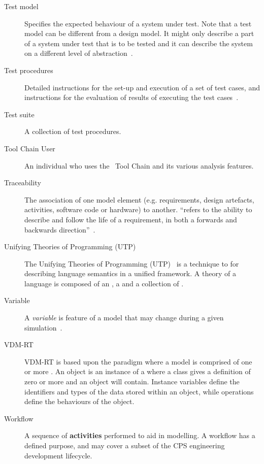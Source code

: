 \begin{description}
\item[Test model] Specifies the expected behaviour of a system under test. Note that a test model can be different from a design model. It might only describe a part of a system under test that is to be tested and it can describe the system on a different level of abstraction~\cite{Coleman&13b}.

\item[Test procedures] Detailed instructions for the set-up and execution of a set of test cases, and instructions for the evaluation of results of executing the test cases~\cite{DO178B, Coleman&13b}.

\item[Test suite] A collection of test procedures.

\item[Tool Chain User] An individual who uses the \into\ Tool Chain and its various analysis features.

\item[Traceability] The association of one model element (e.g. requirements, design artefacts, activities, software code or hardware) to another.  ``refers to the ability to describe and follow the life of a requirement, in both a forwards and backwards direction''~\cite{Gotel&94}.

\item[Unifying Theories of Programming (UTP)]  The Unifying Theories of Programming (UTP)~ \cite{Hoare&98} is a technique to for describing language semantics in a unified framework. A theory of a language is composed of an , a  and a collection of .

\item[Variable] A \emph{variable} is feature of a model that may change during a given simulation~\cite{Broenink&12b}.

\item[VDM-RT] VDM-RT is based upon the  paradigm where a model is comprised of one or more . An object is an instance of a  where a class gives a definition of zero or more  and  an object will contain. Instance variables define the identifiers and types of the data stored within an object, while operations define the behaviours of the object.

\item[Workflow] A sequence of \textbf{activities} performed to aid in modelling. A workflow has a defined purpose, and may cover a subset of the CPS engineering development lifecycle.

\end{description} 